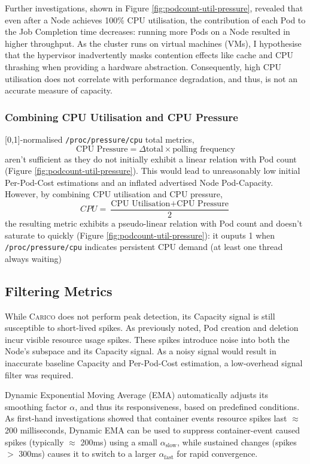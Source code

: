 Further investigations, shown in Figure \ref{fig:podcount-util-pressure},
revealed that even after a Node achieves 100\% CPU utilisation, the contribution
of each Pod to the Job Completion time decreases: running more Pods on a Node
resulted in higher throughput. As the cluster runs on virtual machines (VMs), I
hypothesise that the hypervisor inadvertently masks contention effects like
cache and CPU thrashing when providing a hardware abstraction. Consequently,
high CPU utilisation does not correlate with performance degradation, and thus,
is not an accurate measure of capacity.

\subsubsection{Combining CPU Utilisation and CPU Pressure}
[0,1]-normalised \verb|/proc/pressure/cpu| total metrics,
\[ \text{CPU Pressure} = \Delta \text{total} \times \text{polling frequency} \]
aren't sufficient as they do not initially exhibit a linear relation with Pod
count (Figure \ref{fig:podcount-util-pressure}). This would lead to
unreasonably low initial Per-Pod-Cost estimations and an inflated advertised Node
Pod-Capacity. However, by combining CPU utilisation and CPU pressure,
\[ CPU = \frac{\text{CPU Utilisation} + \text{CPU Pressure}}{2} \]
the resulting metric exhibits a pseudo-linear relation with Pod count and
doesn't saturate to quickly (Figure \ref{fig:podcount-util-pressure}): it ouputs
1 when \verb|/proc/pressure/cpu| indicates persistent CPU demand (at least one
thread always waiting)

\subsection{Filtering Metrics}
While \textsc{Carico} does not perform peak detection, its Capacity signal is
still susceptible to short-lived spikes. As previously noted,  Pod creation and
deletion incur visible resource usage spikes. These spikes introduce noise into
both the Node's subspace and its Capacity signal. As a noisy signal
would result in inaccurate baseline Capacity and Per-Pod-Cost estimation, a
low-overhead signal filter was required.

Dynamic Exponential Moving Average (EMA) automatically adjusts its smoothing
factor $\alpha$, and thus its responsiveness, based on predefined conditions.
As first-hand investigations showed that container events resource spikes last
$\approx$200 milliseconds, Dynamic EMA can be used to
suppress container-event caused spikes (typically $\approx$ 200ms) using a small
$\alpha_{\text{slow}}$, while sustained changes (spikes $>$ 300ms) causes it to
switch to a larger $\alpha_{\text{fast}}$ for rapid convergence.

